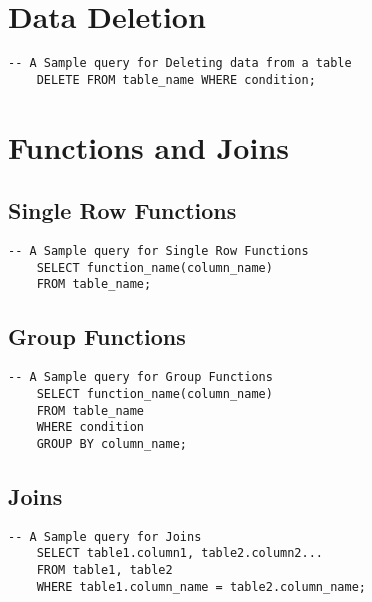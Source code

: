 \section{Data Deletion}
\begin{lstlisting}[caption={Sample one Table}, label={lst:d1}]
    -- A Sample query for Deleting data from a table
    DELETE FROM table_name WHERE condition;
    \end{lstlisting}

\section{Functions and Joins}

\subsection{Single Row Functions}
\begin{lstlisting}[caption={Sample one Table}, label={lst:s1}]
    -- A Sample query for Single Row Functions
    SELECT function_name(column_name)
    FROM table_name;
    \end{lstlisting}


    \subsection{Group Functions}
\begin{lstlisting}[caption={Sample one Table}, label={lst:g1}]
    -- A Sample query for Group Functions
    SELECT function_name(column_name)
    FROM table_name
    WHERE condition
    GROUP BY column_name;
    \end{lstlisting}


    \subsection{Joins}
\begin{lstlisting}[caption={Sample one Table}, label={lst:j1}]
    -- A Sample query for Joins
    SELECT table1.column1, table2.column2...
    FROM table1, table2
    WHERE table1.column_name = table2.column_name;
    \end{lstlisting}
